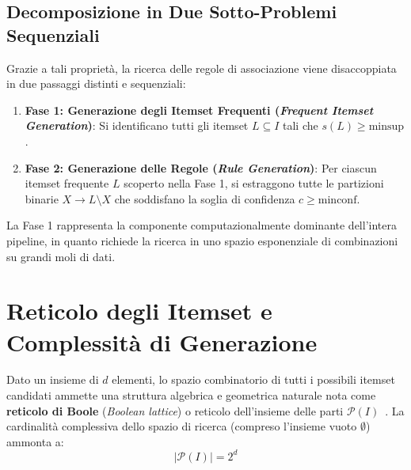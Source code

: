 \FloatBarrier
\subsection{Decomposizione in Due Sotto-Problemi Sequenziali}
Grazie a tali proprietà, la ricerca delle regole di associazione viene disaccoppiata in due passaggi distinti e sequenziali:
\begin{enumerate}
    \item \textbf{Fase 1: Generazione degli Itemset Frequenti (\textit{Frequent Itemset Generation})}: Si identificano tutti gli itemset $L \subseteq I$ tali che $s(L) \ge \mathrm{minsup}$.
    \item \textbf{Fase 2: Generazione delle Regole (\textit{Rule Generation})}: Per ciascun itemset frequente $L$ scoperto nella Fase 1, si estraggono tutte le partizioni binarie $X \rightarrow L \setminus X$ che soddisfano la soglia di confidenza $c \ge \mathrm{minconf}$.
\end{enumerate}

La Fase 1 rappresenta la componente computazionalmente dominante dell'intera pipeline, in quanto richiede la ricerca in uno spazio esponenziale di combinazioni su grandi moli di dati.

\FloatBarrier
\section{Reticolo degli Itemset e Complessità di Generazione}
\label{sec:dm-itemset-lattice}

Dato un insieme di $d$ elementi, lo spazio combinatorio di tutti i possibili itemset candidati ammette una struttura algebrica e geometrica naturale nota come \textbf{reticolo di Boole} (\textit{Boolean lattice}) o reticolo dell'insieme delle parti $\mathcal{P}(I)$~\cite{tan2018}. La cardinalità complessiva dello spazio di ricerca (compreso l'insieme vuoto $\emptyset$) ammonta a:
\begin{equation}
|\mathcal{P}(I)| = 2^d
\end{equation}

